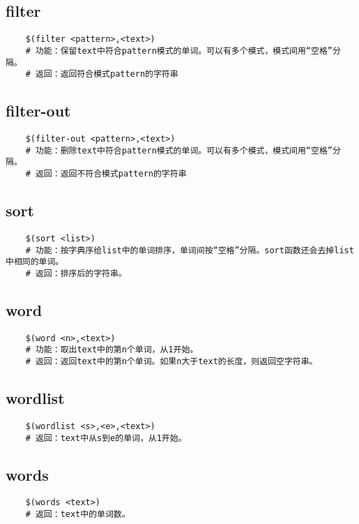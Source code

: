 \documentclass[a4paper,left=2.5cm,right=2.5cm,11pt]{article}
\begin{document}
\subsection{filter}
	\begin{lstlisting}
	$(filter <pattern>,<text>)
	# 功能：保留text中符合pattern模式的单词。可以有多个模式，模式间用“空格”分隔。
	# 返回：返回符合模式pattern的字符串
	\end{lstlisting}

\subsection{filter-out}
	\begin{lstlisting}
	$(filter-out <pattern>,<text>)
	# 功能：删除text中符合pattern模式的单词。可以有多个模式，模式间用“空格”分隔。
	# 返回：返回不符合模式pattern的字符串
	\end{lstlisting}

\subsection{sort}
	\begin{lstlisting}
	$(sort <list>)
	# 功能：按字典序给list中的单词排序，单词间按“空格”分隔。sort函数还会去掉list中相同的单词。
	# 返回：排序后的字符串。
	\end{lstlisting}

\subsection{word}
	\begin{lstlisting}
	$(word <n>,<text>)
	# 功能：取出text中的第n个单词，从1开始。
	# 返回：返回text中的第n个单词。如果n大于text的长度，则返回空字符串。
	\end{lstlisting}

\subsection{wordlist}
	\begin{lstlisting}
	$(wordlist <s>,<e>,<text>)
	# 返回：text中从s到e的单词，从1开始。
	\end{lstlisting}

\subsection{words}
	\begin{lstlisting}
	$(words <text>)
	# 返回：text中的单词数。
	\end{lstlisting}
\end{document}
